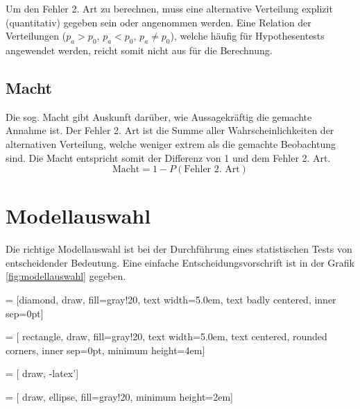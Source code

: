 Um den Fehler 2. Art zu berechnen, muss eine alternative Verteilung 
explizit (quantitativ) gegeben sein oder angenommen werden. Eine Relation
der Verteilungen ($p_a > p_0$, $p_a < p_0$, $p_a \neq p_0$), welche 
häufig für Hypothesentests angewendet werden, reicht somit nicht aus für
die Berechnung.

\subsection{Macht}
Die sog. Macht gibt Auskunft darüber, wie Aussagekräftig die gemachte
Annahme ist. Der Fehler 2. Art ist die Summe aller Wahrscheinlichkeiten
der alternativen Verteilung, welche weniger extrem als die gemachte 
Beobachtung sind. Die Macht entspricht somit der Differenz von 1 und 
dem Fehler 2. Art.
\[  
	\text{Macht} = 1 - P(\text{Fehler 2. Art})
\]

\clearpage
\newpage
\section{Modellauswahl}
Die richtige Modellauswahl ist bei der Durchführung eines statistischen
Tests von entscheidender Bedeutung. Eine einfache Entscheidungsvorschrift
ist in der Grafik \ref{fig:modellauswahl} gegeben.

 = [diamond, 
			draw, 
			fill=gray!20, 
			text width=5.0em, 
			text badly centered, 
			inner sep=0pt]

 = [	rectangle, 
			draw, 
			fill=gray!20, 
			text width=5.0em, 
			text centered, 
			rounded corners,
			inner sep=0pt,
			minimum height=4em]

 = [	draw, 
			-latex']

 = [	draw, 
			ellipse,
			fill=gray!20, 
			minimum height=2em]

